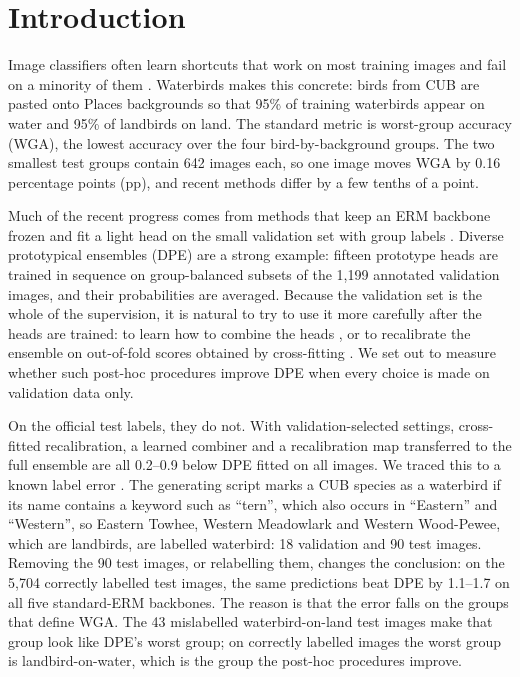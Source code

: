 \section{Introduction}
Image classifiers often learn shortcuts that work on most training images and fail on a minority of them \cite{geirhos2020shortcut}. Waterbirds \cite{sagawa2020groupdro} makes this concrete: birds from CUB \cite{wah2011cub} are pasted onto Places backgrounds \cite{zhou2018places} so that 95\% of training waterbirds appear on water and 95\% of landbirds on land. The standard metric is worst-group accuracy (WGA), the lowest accuracy over the four bird-by-background groups. The two smallest test groups contain 642 images each, so one image moves WGA by 0.16 percentage points (pp), and recent methods differ by a few tenths of a point.

Much of the recent progress comes from methods that keep an ERM backbone frozen and fit a light head on the small validation set with group labels \cite{kirichenko2023dfr,izmailov2022feature,labonte2023fewer}. Diverse prototypical ensembles (DPE) \cite{to2025dpe} are a strong example: fifteen prototype heads are trained in sequence on group-balanced subsets of the 1,199 annotated validation images, and their probabilities are averaged. Because the validation set is the whole of the supervision, it is natural to try to use it more carefully after the heads are trained: to learn how to combine the heads \cite{wolpert1992stacking,breiman1996stacked}, or to recalibrate the ensemble on out-of-fold scores obtained by cross-fitting \cite{chernozhukov2018dml,platt1999probabilistic}. We set out to measure whether such post-hoc procedures improve DPE when every choice is made on validation data only.

On the official test labels, they do not. With validation-selected settings, cross-fitted recalibration, a learned combiner and a recalibration map transferred to the full ensemble are all 0.2--0.9\pp{} below DPE fitted on all images. We traced this to a known label error \cite{sagawa2020code,asgari2022masktune}. The generating script marks a CUB species as a waterbird if its name contains a keyword such as ``tern'', which also occurs in ``Eastern'' and ``Western'', so Eastern Towhee, Western Meadowlark and Western Wood-Pewee, which are landbirds, are labelled waterbird: 18 validation and 90 test images. Removing the 90 test images, or relabelling them, changes the conclusion: on the 5,704 correctly labelled test images, the same predictions beat DPE by 1.1--1.7\pp{} on all five standard-ERM backbones. The reason is that the error falls on the groups that define WGA. The 43 mislabelled waterbird-on-land test images make that group look like DPE's worst group; on correctly labelled images the worst group is landbird-on-water, which is the group the post-hoc procedures improve.

